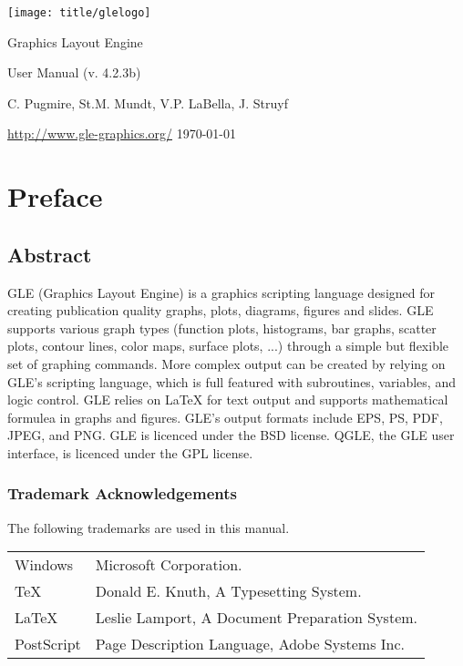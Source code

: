 \thispagestyle{empty}
\begin{center}
\texttt{[image: title/glelogo]}

{\Huge Graphics Layout Engine}

\vspace{1cm}

{\huge User Manual (v. 4.2.3b)}

\vspace{1cm}

C. Pugmire, St.M. Mundt, V.P. LaBella, J. Struyf

\vspace{1cm}

\url{http://www.gle-graphics.org/}
\vfill
\today{}
\end{center}


\tableofcontents

\chapter{Preface}

\section*{Abstract}

GLE (Graphics Layout Engine) is a graphics scripting language designed for creating publication quality graphs, plots, diagrams, figures and slides. GLE supports various graph types (function plots, histograms, bar graphs, scatter plots, contour lines, color maps, surface plots, ...) through a simple but flexible set of graphing commands. More complex output can be created by relying on GLE's scripting language, which is full featured with subroutines, variables, and logic control. GLE relies on \LaTeX{} for text output and supports mathematical formulea in graphs and figures. GLE's output formats include EPS, PS, PDF, JPEG, and PNG. GLE is licenced under the BSD license. QGLE, the GLE user interface, is licenced under the GPL license.

\subsection*{Trademark Acknowledgements}
The following trademarks are used in this manual.

\begin{tabular}{ll} %
{Windows}	& Microsoft Corporation.\\
{\TeX}		& Donald E. Knuth, A Typesetting System.\\
{\LaTeX}	& Leslie Lamport, A Document Preparation System.\\
{PostScript}	& Page Description Language, Adobe Systems Inc.\\
\end{tabular}

